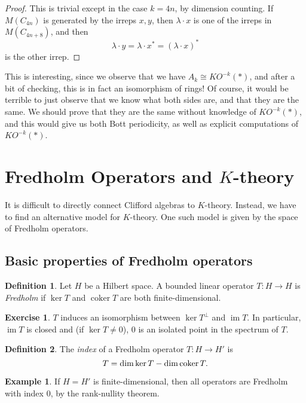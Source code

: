 \documentclass{shortart}
\theoremstyle{definition}
\newtheorem*{defi}{Definition}
\newtheorem*{eg}{Example}
\newtheorem*{ex}{Exercise}
\let\index\relax
\DeclareMathOperator{\coker}{coker}
\DeclareMathOperator{\index}{idx}
\DeclareMathOperator{\im}{im}
\begin{document}
\begin{proof}
  This is trivial except in the case $k = 4n$, by dimension counting. If $M(C_{4n})$ is generated by the irreps $x, y$, then $\lambda \cdot x$ is one of the irreps in $M(C_{4n + 8})$, and then
  \[
    \lambda \cdot y = \lambda \cdot x^* = (\lambda \cdot x)^*
  \]
  is the other irrep.
\end{proof}
This is interesting, since we observe that we have $A_k \cong KO^{-k}(*)$, and after a bit of checking, this is in fact an isomorphism of rings! Of course, it would be terrible to just observe that we know what both sides are, and that they are the same. We should prove that they are the same without knowledge of $KO^{-k}(*)$, and this would give us both Bott periodicity, as well as explicit computations of $KO^{-k}(*)$.

\section{Fredholm Operators and \texorpdfstring{$K$}{K}-theory}
It is difficult to directly connect Clifford algebras to $K$-theory. Instead, we have to find an alternative model for $K$-theory. One such model is given by the space of Fredholm operators.

\subsection{Basic properties of Fredholm operators}
\begin{defi}
  Let $H$ be a Hilbert space. A bounded linear operator $T: H \to H$ is \emph{Fredholm} if $\ker T$ and $\coker T$ are both finite-dimensional.
\end{defi}
\begin{ex}
  $T$ induces an isomorphism between $\ker T^\perp$ and $\im T$. In particular, $\im T$ is closed and (if $\ker T \not= 0$), $0$ is an isolated point in the spectrum of $T$.
\end{ex}

\begin{defi}
  The \emph{index} of a Fredholm operator $T: H \to H'$ is
  \[
    \index T = \dim \ker T - \dim \coker T.
  \]
\end{defi}

\begin{eg}
  If $H = H'$ is finite-dimensional, then all operators are Fredholm with index $0$, by the rank-nullity theorem.
\end{eg}
\end{document}
